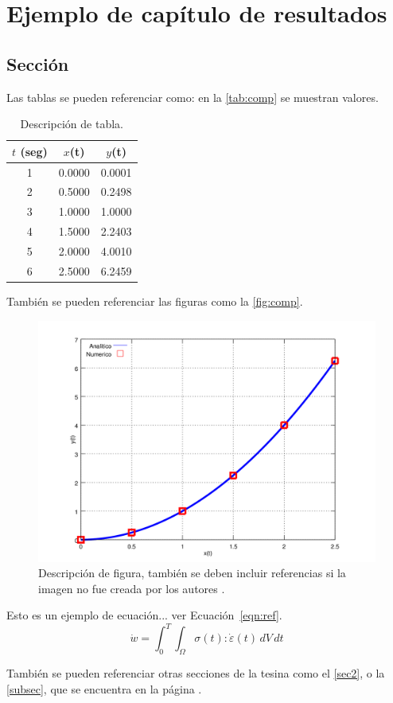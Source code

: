 \chapter{Ejemplo de capítulo de resultados}


\section{Sección}

Las tablas se pueden referenciar como: en la \autoref{tab:comp} se muestran valores.

\begin{table}[h!]
\centering
\caption{Descripción de tabla.}
\label{tab:comp}
\begin{tabular}{|c|c|c|}
  \hline
  $t$ (seg) & $x$(t) & $y$(t)\\
  \hline
  1 & 0.0000 & 0.0001\\
  2 & 0.5000 & 0.2498\\
  3 & 1.0000 & 1.0000\\
  4 & 1.5000 & 2.2403\\
  5 & 2.0000 & 4.0010\\
  6 & 2.5000 & 6.2459\\
  \hline
\end{tabular}
\end{table}

También se pueden referenciar las figuras como la \autoref{fig:comp}.

\begin{figure}[h!]
\includegraphics[width=\textwidth]{imagenes/chap4/x_vs_y}
\caption{Descripción de figura, también se deben incluir referencias si la imagen no fue creada por los autores \citep{LeMagorou2002}.}
\label{fig:comp}
\end{figure}

Esto es un ejemplo de ecuación... ver Ecuación~\eqref{eqn:ref}.
\begin{equation}\label{eqn:ref}
\dot{w} = \int_0^T \int_{\Omega} \sigma(t) : \dot{\varepsilon}(t) \, dV \, dt
\end{equation}


También se pueden referenciar otras secciones de la tesina como el \autoref{sec2}, o la \autoref{subsec}, que se encuentra en la página \pageref{sec2}.